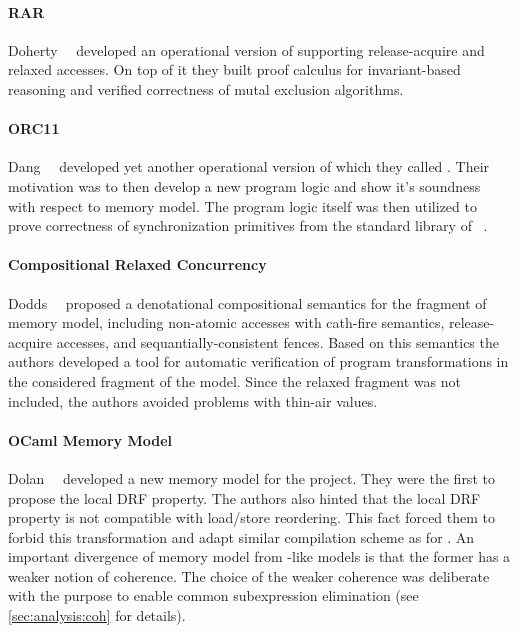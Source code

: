 \paragraph{RAR}

Doherty~\etal~\cite{Doherty-al:PPoPP19} developed an 
operational version of \RCMM supporting 
release-acquire and relaxed accesses. 
On top of it they built proof calculus for 
invariant-based reasoning and verified 
correctness of mutal exclusion algorithms. 

\paragraph{ORC11}

Dang~\etal~\cite{Dang-al:POPL19} developed yet another 
operational version of \RCMM which they called \ORCMM. 
Their motivation was to then develop a 
new program logic and show it's soundness
with respect to \ORCMM memory model. 
The program logic itself was then utilized to 
prove correctness of synchronization primitives 
from the standard library of \Rust~\cite{RustBook:19}.

\paragraph{Compositional Relaxed Concurrency}

Dodds~\etal~\cite{Dodds-al:ESOP18} proposed a denotational 
compositional semantics for the fragment of \CMM memory model, 
including non-atomic accesses with cath-fire semantics, 
release-acquire accesses, and sequantially-consistent fences. 
Based on this semantics the authors developed 
a tool for automatic verification of program transformations
in the considered fragment of the \CMM model. 
Since the relaxed fragment was not included, 
the authors avoided problems with thin-air values. 

\paragraph{OCaml Memory Model}

Dolan~\etal~\cite{Dolan-al:PLDI18} developed a new 
memory model for the \MOCaml project. 
They were the first to propose the local DRF property. 
The authors also hinted that the local DRF property 
is not compatible with load/store reordering.
This fact forced them to forbid this transformation
and adapt similar compilation scheme as for \RCMM. 
An important divergence of \OCaml memory model 
from \CMM-like models is that the former 
has a weaker notion of coherence.
The choice of the weaker coherence was deliberate 
with the purpose to enable common subexpression elimination
(see \cref{sec:analysis:coh} for details).

